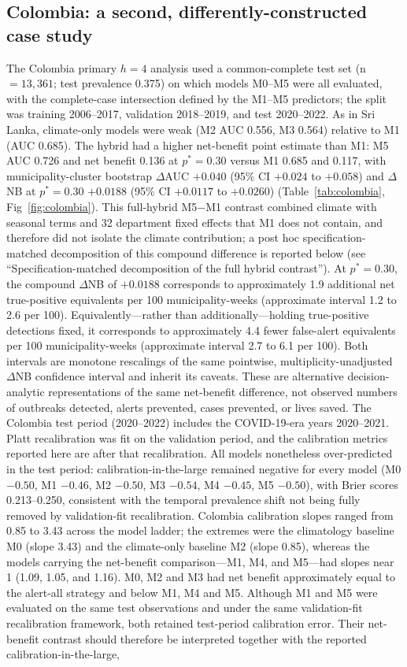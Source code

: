 \documentclass[11pt,a4paper]{article}
\begin{document}
\subsection{Colombia: a second, differently-constructed case study}
The Colombia primary $h=4$ analysis used a common-complete test set (n${}=13{,}361$; test prevalence 0.375) on which models M0--M5 were all evaluated, with the complete-case intersection defined by the M1--M5 predictors; the split was training 2006--2017, validation 2018--2019, and test 2020--2022. As in Sri Lanka, climate-only models were weak (M2 AUC 0.556, M3 0.564) relative to M1 (AUC 0.685). The hybrid had a higher net-benefit point estimate than M1: M5 AUC 0.726 and net benefit 0.136 at $p^*=0.30$ versus M1 0.685 and 0.117, with municipality-cluster bootstrap $\Delta$AUC $+0.040$ (95\% CI $+0.024$ to $+0.058$) and $\Delta$NB at $p^*=0.30$ $+0.0188$ (95\% CI $+0.0117$ to $+0.0260$) (Table~\ref{tab:colombia}, Fig~\ref{fig:colombia}). This full-hybrid M5$-$M1 contrast combined climate with seasonal terms and 32 department fixed effects that M1 does not contain, and therefore did not isolate the climate contribution; a post hoc specification-matched decomposition of this compound difference is reported below (see ``Specification-matched decomposition of the full hybrid contrast''). At $p^*=0.30$, the compound $\Delta$NB of $+0.0188$ corresponds to approximately 1.9 additional net true-positive equivalents per 100 municipality-weeks (approximate interval 1.2 to 2.6 per 100). Equivalently---rather than additionally---holding true-positive detections fixed, it corresponds to approximately 4.4 fewer false-alert equivalents per 100 municipality-weeks (approximate interval 2.7 to 6.1 per 100). Both intervals are monotone rescalings of the same pointwise, multiplicity-unadjusted $\Delta$NB confidence interval and inherit its caveats. These are alternative decision-analytic representations of the same net-benefit difference, not observed numbers of outbreaks detected, alerts prevented, cases prevented, or lives saved. The Colombia test period (2020--2022) includes the COVID-19-era years 2020--2021. Platt recalibration was fit on the validation period, and the calibration metrics reported here are after that recalibration. All models nonetheless over-predicted in the test period: calibration-in-the-large remained negative for every model (M0 $-0.50$, M1 $-0.46$, M2 $-0.50$, M3 $-0.54$, M4 $-0.45$, M5 $-0.50$), with Brier scores 0.213--0.250, consistent with the temporal prevalence shift not being fully removed by validation-fit recalibration. Colombia calibration slopes ranged from 0.85 to 3.43 across the model ladder; the extremes were the climatology baseline M0 (slope 3.43) and the climate-only baseline M2 (slope 0.85), whereas the models carrying the net-benefit comparison---M1, M4, and M5---had slopes near 1 (1.09, 1.05, and 1.16). M0, M2 and M3 had net benefit approximately equal to the alert-all strategy and below M1, M4 and M5. Although M1 and M5 were evaluated on the same test observations and under the same validation-fit recalibration framework, both retained test-period calibration error. Their net-benefit contrast should therefore be interpreted together with the reported calibration-in-the-large, 
\end{document}
